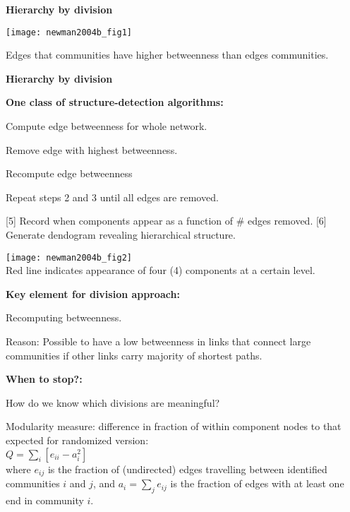   


  \textbf{Hierarchy by division}

  \texttt{[image: newman2004b\_fig1]}

  
   
    Edges that  communities have 
    \alert{higher betweenness} 
    than edges  communities.
  


  \textbf{Hierarchy by division}

  \textbf{One class of structure-detection algorithms:}
    
     
      Compute edge betweenness for whole network.
     
      \alert{Remove} edge with highest betweenness.
     
      Recompute edge betweenness
    
      Repeat steps 2 and 3 until all edges are removed.
    
          
      
      [5]
        Record when components appear as a function
        of \# edges removed.
      [6]
        Generate \alert{dendogram} revealing hierarchical structure.
      
      
              
        
        \texttt{[image: newman2004b\_fig2]}\\
        { \small \alert{Red line}
          indicates appearance of four (4) components
          at a certain level.
        }
            





  \textbf{Key element for division approach:}
    
     
      Recomputing betweenness.
     
      \alert{Reason:} Possible to have a low betweenness
      in links that connect large communities
      if other links carry majority of shortest paths.
    
  

  \textbf{When to stop?:}
    
     
      How do we know which
      divisions are meaningful?
     
      \alert{Modularity measure:}
      difference in fraction of within component
      nodes to that expected for randomized version:\\
      \smallskip
      {
      $
      Q = 
      \sum_{i}
      [e_{ii} - a_{i}^2]
      $\\
      \smallskip
      where $e_{ij}$ is the fraction of (undirected) edges
      travelling between identified communities $i$ and $j$,
      and $a_i = \sum_{j}e_{ij}$ is the fraction of edges with
      at least one end in community $i$.
    }
    
